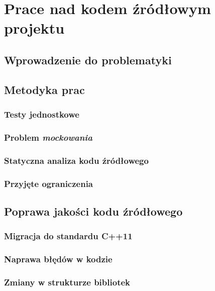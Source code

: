 \chapter{Prace nad kodem źródłowym projektu}
\label{cha:code}

\section{Wprowadzenie do problematyki}

\section{Metodyka prac}

    \subsection{Testy jednostkowe}

    \subsection{Problem \emph{mockowania}}

    \subsection{Statyczna analiza kodu źródłowego}

    \subsection{Przyjęte ograniczenia}

\section{Poprawa jakości kodu źródłowego}

    \subsection{Migracja do standardu C++11}

    \subsection{Naprawa błędów w kodzie}

    \subsection{Zmiany w strukturze bibliotek}

